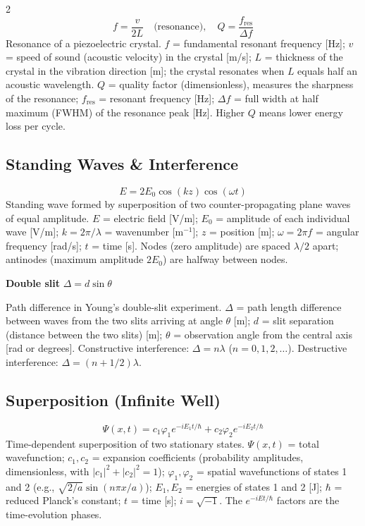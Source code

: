 \documentclass[9pt]{extarticle}
\newcommand{\eqlabel}[1]{\textbf{\scriptsize #1}\;}
\newcommand{\desc}[1]{{\small\color{desc}#1}}
\begin{document}
\begin{multicols}{2}
\[f = \frac{v}{2L} \quad\text{(resonance)},\quad Q = \frac{f_{\text{res}}}{\Delta f}\]
\desc{Resonance of a piezoelectric crystal. $f$ = fundamental resonant frequency [Hz]; $v$ = speed of sound (acoustic velocity) in the crystal [m/s]; $L$ = thickness of the crystal in the vibration direction [m]; the crystal resonates when $L$ equals half an acoustic wavelength. $Q$ = quality factor (dimensionless), measures the sharpness of the resonance; $f_{\text{res}}$ = resonant frequency [Hz]; $\Delta f$ = full width at half maximum (FWHM) of the resonance peak [Hz]. Higher $Q$ means lower energy loss per cycle.}

\subsection{Standing Waves \& Interference}
\[E = 2E_0\cos(kz)\cos(\omega t)\]
\desc{Standing wave formed by superposition of two counter-propagating plane waves of equal amplitude. $E$ = electric field [V/m]; $E_0$ = amplitude of each individual wave [V/m]; $k = 2\pi/\lambda$ = wavenumber [m$^{-1}$]; $z$ = position [m]; $\omega = 2\pi f$ = angular frequency [rad/s]; $t$ = time [s]. Nodes (zero amplitude) are spaced $\lambda/2$ apart; antinodes (maximum amplitude $2E_0$) are halfway between nodes.}

\eqlabel{Double slit} $\Delta = d\sin\theta$

\desc{Path difference in Young's double-slit experiment. $\Delta$ = path length difference between waves from the two slits arriving at angle $\theta$ [m]; $d$ = slit separation (distance between the two slits) [m]; $\theta$ = observation angle from the central axis [rad or degrees]. Constructive interference: $\Delta = n\lambda$ ($n = 0, 1, 2, \ldots$). Destructive interference: $\Delta = (n + 1/2)\lambda$.}

\subsection{Superposition (Infinite Well)}
\[\Psi(x,t) = c_1\varphi_1 e^{-iE_1t/\hbar} + c_2\varphi_2 e^{-iE_2t/\hbar}\]
\desc{Time-dependent superposition of two stationary states. $\Psi(x,t)$ = total wavefunction; $c_1, c_2$ = expansion coefficients (probability amplitudes, dimensionless, with $|c_1|^2 + |c_2|^2 = 1$); $\varphi_1, \varphi_2$ = spatial wavefunctions of states 1 and 2 (e.g., $\sqrt{2/a}\sin(n\pi x/a)$); $E_1, E_2$ = energies of states 1 and 2 [J]; $\hbar$ = reduced Planck's constant; $t$ = time [s]; $i = \sqrt{-1}$. The $e^{-iEt/\hbar}$ factors are the time-evolution phases.}


\end{multicols}
\end{document}
